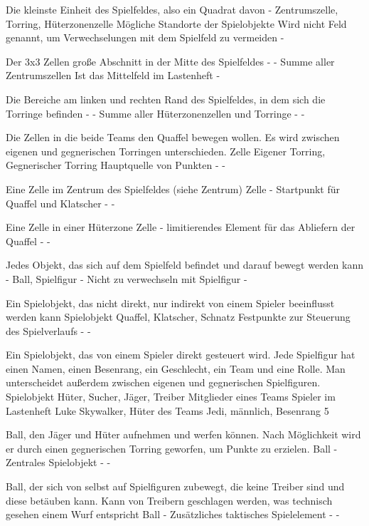 {Die kleinste Einheit des Spielfeldes, also ein Quadrat davon}
{-}
{Zentrumszelle, Torring, Hüterzonenzelle}
{Mögliche Standorte der Spielobjekte}
{Wird nicht Feld genannt, um Verwechselungen mit dem Spielfeld zu vermeiden}
{-}

{Der 3x3 Zellen große Abschnitt in der Mitte des Spielfeldes}
{-}
{-}
{Summe aller Zentrumszellen}
{Ist das Mittelfeld im Lastenheft}
{-}

{Die Bereiche am linken und rechten Rand des Spielfeldes, in dem sich die Torringe befinden}
{-}
{-}
{Summe aller Hüterzonenzellen und Torringe}
{-}
{-}

{Die Zellen in die beide Teams den Quaffel bewegen wollen. Es wird zwischen eigenen und gegnerischen Torringen unterschieden.}
{Zelle}
{Eigener Torring, Gegnerischer Torring}
{Hauptquelle von Punkten}
{-}
{-}

{Eine Zelle im Zentrum des Spielfeldes (siehe Zentrum)}
{Zelle}
{-}
{Startpunkt für Quaffel und Klatscher}
{-}
{-}

{Eine Zelle in einer Hüterzone}
{Zelle}
{-}
{limitierendes Element für das Abliefern der Quaffel}
{-}
{-}

{Jedes Objekt, das sich auf dem Spielfeld befindet und darauf bewegt werden kann}
{-}
{Ball, Spielfigur}
{-}
{Nicht zu verwechseln mit Spielfigur}
{-}

{Ein Spielobjekt, das nicht direkt, nur indirekt von einem Spieler beeinflusst werden kann}
{Spielobjekt}
{Quaffel, Klatscher, Schnatz}
{Festpunkte zur Steuerung des Spielverlaufs}
{-}
{-}

{Ein Spielobjekt, das von einem Spieler direkt gesteuert wird. Jede Spielfigur hat einen Namen, einen Besenrang, ein Geschlecht, ein Team und eine Rolle. Man unterscheidet außerdem zwischen eigenen und gegnerischen Spielfiguren.}
{Spielobjekt}
{Hüter, Sucher, Jäger, Treiber}
{Mitglieder eines Teams}
{Spieler im Lastenheft}
{Luke Skywalker, Hüter des Teams \glqq{}Jedi\grqq{}, männlich, Besenrang 5}

{Ball, den Jäger und Hüter aufnehmen und werfen können. Nach Möglichkeit wird er durch einen gegnerischen Torring geworfen, um Punkte zu erzielen.}
{Ball}
{-}
{Zentrales Spielobjekt}
{-}
{-}

{Ball, der sich von selbst auf Spielfiguren zubewegt, die keine Treiber sind und diese betäuben kann. Kann von Treibern geschlagen werden, was technisch gesehen einem Wurf entspricht}
{Ball}
{-}
{Zusätzliches taktisches Spielelement}
{-}
{-}

